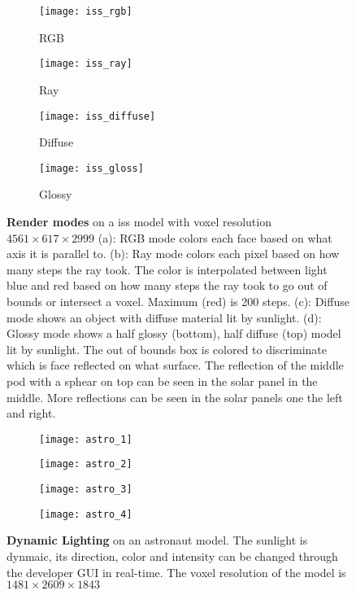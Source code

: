 \begin{figure}[H]
  \centering
  \begin{subfigure}[b]{0.48\textwidth}
    \texttt{[image: iss\_rgb]}
    \caption{RGB}
  \end{subfigure}
  \hfill
  \begin{subfigure}[b]{0.48\textwidth}
    \texttt{[image: iss\_ray]}
    \caption{Ray}
  \end{subfigure}
  \begin{subfigure}[b]{0.48\textwidth}
    \texttt{[image: iss\_diffuse]}
    \caption{Diffuse}
  \end{subfigure}
  \hfill
  \begin{subfigure}[b]{0.48\textwidth}
    \texttt{[image: iss\_gloss]}
    \caption{Glossy}
  \end{subfigure}
  \caption{\textbf{Render modes} on a \acrshort{iss} model with voxel resolution $4561\times617\times2999$
    (a): RGB mode colors each face based on what axis it is parallel to.
    (b): Ray mode colors each pixel based on how many steps the ray took. The color is interpolated between light blue and red based on how many steps the ray took to go out of bounds or intersect a voxel. Maximum (red) is 200 steps.
    (c): Diffuse mode shows an object with diffuse material lit by sunlight.
    (d): Glossy mode shows a half glossy (bottom), half diffuse (top) model lit by sunlight. The out of bounds box is colored to discriminate which is face reflected on what surface. The reflection of the middle pod with a sphear on top can be seen in the solar panel in the middle. More reflections can be seen in the solar panels one the left and right.
  }
  \label{rendermods}
\end{figure}


\begin{figure}[H]
  \centering
  \begin{subfigure}[b]{0.48\textwidth}
    \texttt{[image: astro\_1]}
  \end{subfigure}
  \hfill
  \begin{subfigure}[b]{0.48\textwidth}
    \texttt{[image: astro\_2]}
  \end{subfigure}
  \begin{subfigure}[b]{0.48\textwidth}
    \texttt{[image: astro\_3]}
  \end{subfigure}
  \hfill
  \begin{subfigure}[b]{0.48\textwidth}
    \texttt{[image: astro\_4]}
  \end{subfigure}
  \caption{\textbf{Dynamic Lighting} on an astronaut model. The sunlight is dynmaic, its direction, color and intensity can be changed through the developer GUI in real-time. The voxel resolution of the model is $1481\times2609\times1843$}
\end{figure}

